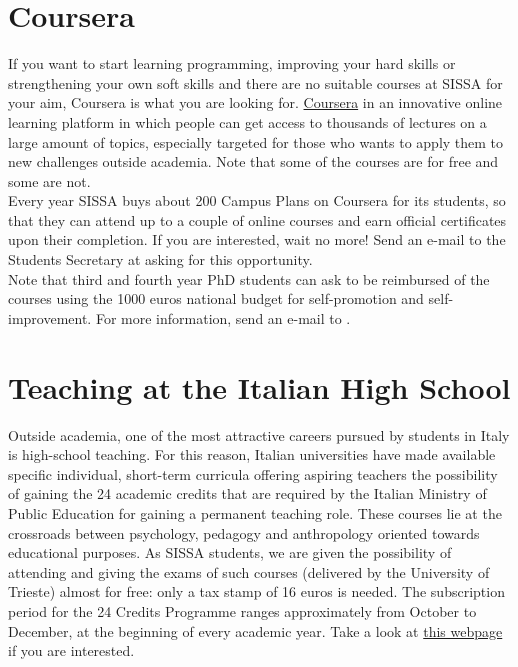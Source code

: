 \documentclass{sissavademecum}
\begin{document}
\section{Coursera}

If you want to start learning programming, improving your hard skills or strengthening your own soft skills and there are no suitable courses at SISSA for your aim, Coursera is what you are looking for. \href{https://www.coursera.org/}{Coursera} in an innovative online learning platform in which people can get access to thousands of lectures on a large amount of topics, especially targeted for those who wants to apply them to new challenges outside academia. Note that some of the courses are for free and some are not. \\
Every year SISSA buys about 200 Campus Plans on Coursera for its students, so that they can attend up to a couple of online courses and earn official certificates upon their completion. If you are interested, wait no more! Send an e-mail to the Students Secretary at  asking for this opportunity. \\
Note that third and fourth year PhD students can ask to be reimbursed of the courses using the 1000 euros national budget for self-promotion and self-improvement. For more information, send an e-mail to .


\section{Teaching at the Italian High School}

Outside academia, one of the most attractive careers pursued by students in Italy is high-school teaching. For this reason, Italian universities have made available specific individual, short-term curricula offering aspiring teachers the possibility of gaining the 24 academic credits that are required by the Italian Ministry of Public Education for gaining a permanent teaching role. These courses lie at the crossroads between psychology, pedagogy and anthropology oriented towards educational purposes. As SISSA students, we are given the possibility of attending and giving the exams of such courses (delivered by the University of Trieste) almost for free: only a tax stamp of 16 euros is needed. The subscription period for the 24 Credits Programme ranges approximately from October to December, at the beginning of every academic year. Take a look at \href{https://www.units.it/offerta-formativa/percorso-formativo-24-cfu}{this webpage} if you are interested.
\end{document}
